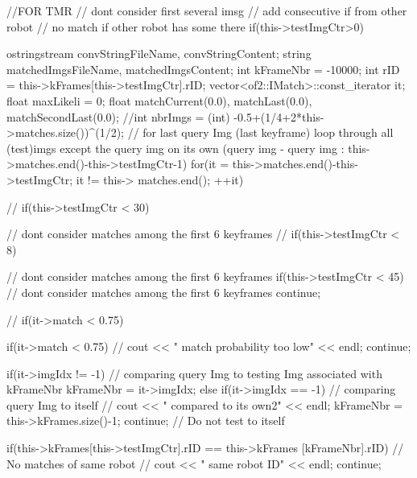 \begin{DoxyCode}
                                        {
        //FOR TMR
        // dont consider first several imsg
        // add consecutive if from other robot
        // no match if other robot has some there
        if(this->testImgCtr>0) {

                ostringstream convStringFileName, convStringContent;
                string matchedImgsFileName, matchedImgsContent;
                int kFrameNbr = -10000;
                int rID = this->kFrames[this->testImgCtr].rID;
                vector<of2::IMatch>::const_iterator it;
                float maxLikeli = 0;
                float matchCurrent(0.0), matchLast(0.0), matchSecondLast(0.0);
                //int nbrImgs = (int) -0.5+(1/4+2*this->matches.size())^(1/2);
                // for last query Img (last keyframe) loop through all
       (test)imgs except the query img on its own (query img - query img :
       this->matches.end()-this->testImgCtr-1)
                for(it = this->matches.end()-this->testImgCtr; it != this->
      matches.end(); ++it) {

//                      if(this->testImgCtr < 30) { // dont consider matches
       among the first 6 keyframes
//                      if(this->testImgCtr < 8) { // dont consider matches
       among the first 6 keyframes
                        if(this->testImgCtr < 45) { // dont consider matches
       among the first 6 keyframes
                                continue;
                        }


//                      if(it->match < 0.75) {
                        if(it->match < 0.75) {
//                              cout << "               match probability too
       low" << endl;
                                continue;
                        }

                        if(it->imgIdx != -1) { // comparing query Img to
       testing Img associated with kFrameNbr
                                kFrameNbr = it->imgIdx;
                        }
                        else if(it->imgIdx == -1) { // comparing query Img to
       itself
//                              cout << "               compared to its own2"
       << endl;
                                kFrameNbr = this->kFrames.size()-1;
                                continue; // Do not test to itself
                        }

                        if(this->kFrames[this->testImgCtr].rID == this->kFrames
      [kFrameNbr].rID) { // No matches of same robot
//                              cout << "               same robot ID" << endl;
                                continue;
                        }

}}}}}}
\end{DoxyCode}
